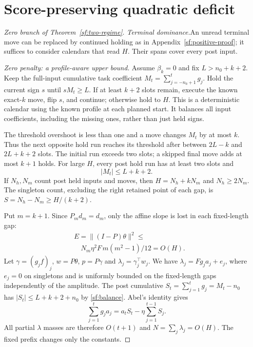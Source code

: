 \documentclass[journal]{IEEEtran}
\begin{document}
\section{Score-preserving quadratic deficit}\label{sf:zero-proof}
\begin{proof}[Zero branch of Theorem~\ref{sf:two-regime}]\leavevmode
\par\smallskip\noindent\textit{Terminal dominance.}\enspace  An unread terminal move can be replaced
by continued holding as in Appendix~\ref{sf:positive-proof}; it suffices to
consider calendars that read $H$. Their spans cover every post input.

\par\smallskip\noindent\textit{Zero penalty: a profile-aware upper bound.}\enspace 
Assume $\beta_k=0$ and fix $L>n_0+k+2$.
Keep the full-input cumulative task coefficient
$M_t=\sum_{j=-n_0+1}^t g_j$.
Hold the current sign $s$ until $sM_t\ge L$.
If at least $k+2$ slots remain, execute the known exact-$k$ move,
flip $s$, and continue; otherwise hold to $H$.
This is a deterministic calendar using the known profile at each
planned start. It balances all input coefficients, including the
missing ones, rather than just held signs.

The threshold overshoot is less than one and a move changes $M_t$
by at most $k$. Thus the next opposite hold run reaches its threshold
after between $2L-k$ and $2L+k+2$ slots.
The initial run exceeds two slots; a skipped final move adds at most
$k+1$ holds. For large $H$, every post hold run has at least two
slots and
\begin{equation}\label{sf:balance}
|M_t|\le L+k+2 .
\end{equation}
If $N_h,N_m$ count post held inputs and moves, then
$H=N_h+kN_m$ and $N_h\ge2N_m$.
The singleton count, excluding the right retained point of each gap,
is $S=N_h-N_m\ge H/(k+2)$.

Put $m=k+1$. Since $P_md_m=d_m$, only the affine slope is lost
in each fixed-length gap:
\begin{equation}\label{sf:slope-loss}
\begin{aligned}
&E=\|(I-P)\theta\|^2\le\\
&\quad N_m\eta^2F\,m(m^2-1)/12=O(H).
\end{aligned}
\end{equation}
Let $\gamma=(g_jf)_j$, $w=P\theta$, $p=P\gamma$ and
$\lambda_j=\gamma_j^\top w_j$.
We have $\lambda_j=Fg_ja_j+e_j$, where $e_j=0$ on singletons
and is uniformly bounded on the fixed-length gaps independently
of the amplitude. The post cumulative $S_t=\sum_{j=1}^tg_j=M_t-n_0$
has $|S_t|\le L+k+2+n_0$ by \eqref{sf:balance}. Abel's identity gives
\[
\sum_{j=1}^t g_ja_j=a_tS_t-\eta\sum_{j=1}^{t-1}S_j .
\]
All partial $\lambda$ masses are therefore $O(t+1)$ and
$N=\sum_j\lambda_j=O(H)$. The fixed prefix changes only the constants.


\end{proof}
\end{document}

